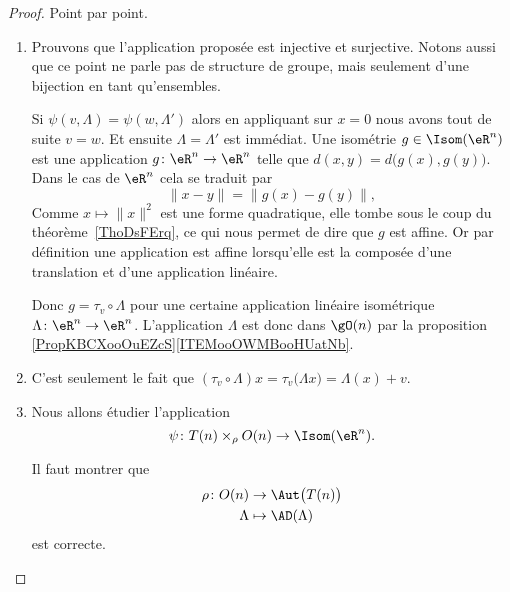 \begin{proof}
	Point par point.
	\begin{enumerate}
		\item
		      Prouvons que l'application proposée est injective et surjective. Notons aussi que ce point ne parle pas de structure de groupe, mais seulement d'une bijection en tant qu'ensembles.
		      \begin{subproof}
			      \spitem[Injection]
			      Si \( \psi(v,\Lambda)=\psi(w,\Lambda')\) alors en appliquant sur \( x=0\) nous avons tout de suite \( v=w\). Et ensuite \( \Lambda=\Lambda'\) est immédiat.
			      \spitem[Surjection]
			      Une isométrie \( g\in\Isom(\eR^n)\) est une application \( g\colon \eR^n\to \eR^n\) telle que \( d(x,y)=d\big( g(x),g(y) \big)\). Dans le cas de \( \eR^n\) cela se traduit par
			      \begin{equation}
				      \| x-y \|=\big\| g(x)-g(y) \big\|,
			      \end{equation}
			      Comme \( x\mapsto\| x \|^2\) est une forme quadratique, elle tombe sous le coup du théorème~\ref{ThoDsFErq}, ce qui nous permet de dire que \( g\) est affine. Or par définition une application est affine lorsqu'elle est la composée d'une translation et d'une application linéaire.

			      Donc \( g=\tau_v\circ \Lambda\) pour une certaine application linéaire isométrique \( \Lambda\colon \eR^n\to \eR^n\). L'application \( \Lambda\) est donc dans \( \gO(n)\) par la proposition \ref{PropKBCXooOuEZcS}\ref{ITEMooOWMBooHUatNb}.
		      \end{subproof}
		\item
		      C'est seulement le fait que \( (\tau_v\circ\Lambda)x=\tau_v\big( \Lambda x \big)=\Lambda(x)+v\).
		\item
		      Nous allons étudier l'application
		      \begin{equation}
			      \psi\colon T(n)\times_{\rho}O(n)\to \Isom(\eR^n).
		      \end{equation}
		      \begin{subproof}
			      Il faut montrer que
			      \begin{equation}
				      \begin{aligned}
					      \rho\colon O(n) & \to \Aut\big( T(n) \big) \\
					      \Lambda         & \mapsto \AD(\Lambda)
				      \end{aligned}
			      \end{equation}
			      est correcte.


\end{subproof}
\end{enumerate}
\end{proof}
